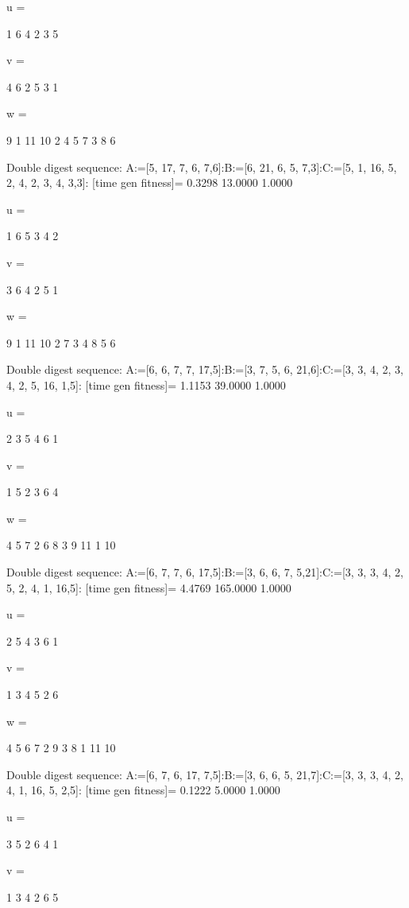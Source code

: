 u =

     1     6     4     2     3     5


v =

     4     6     2     5     3     1


w =

     9     1    11    10     2     4     5     7     3     8     6

Double digest sequence:
A:=[5, 17, 7, 6, 7,6]:B:=[6, 21, 6, 5, 7,3]:C:=[5, 1, 16, 5, 2, 4, 2, 3, 4, 3,3]:
[time gen fitness]=
    0.3298   13.0000    1.0000


u =

     1     6     5     3     4     2


v =

     3     6     4     2     5     1


w =

     9     1    11    10     2     7     3     4     8     5     6

Double digest sequence:
A:=[6, 6, 7, 7, 17,5]:B:=[3, 7, 5, 6, 21,6]:C:=[3, 3, 4, 2, 3, 4, 2, 5, 16, 1,5]:
[time gen fitness]=
    1.1153   39.0000    1.0000


u =

     2     3     5     4     6     1


v =

     1     5     2     3     6     4


w =

     4     5     7     2     6     8     3     9    11     1    10

Double digest sequence:
A:=[6, 7, 7, 6, 17,5]:B:=[3, 6, 6, 7, 5,21]:C:=[3, 3, 3, 4, 2, 5, 2, 4, 1, 16,5]:
[time gen fitness]=
    4.4769  165.0000    1.0000


u =

     2     5     4     3     6     1


v =

     1     3     4     5     2     6


w =

     4     5     6     7     2     9     3     8     1    11    10

Double digest sequence:
A:=[6, 7, 6, 17, 7,5]:B:=[3, 6, 6, 5, 21,7]:C:=[3, 3, 3, 4, 2, 4, 1, 16, 5, 2,5]:
[time gen fitness]=
    0.1222    5.0000    1.0000


u =

     3     5     2     6     4     1


v =

     1     3     4     2     6     5


